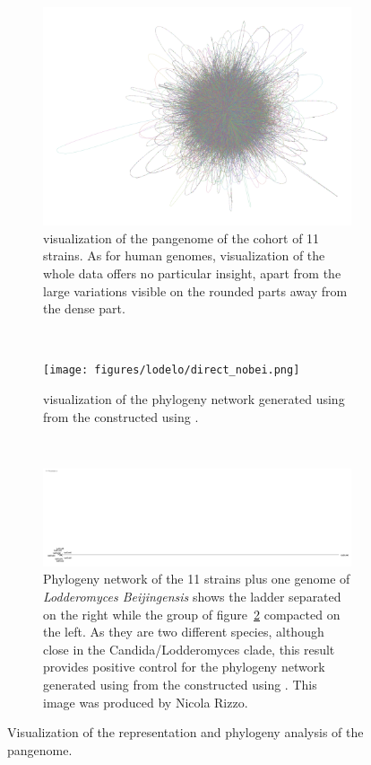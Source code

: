 \begin{figure}[h!]
	\centering
	\begin{subfigure}[b]{0.75\textwidth}
		\centering
		\includegraphics[width=1\linewidth]{figures/lodelo/lodElo_k25.png}
		\caption{\bandage visualization of the pangenome \dbg of the cohort of 11 \lodelo strains. As for human genomes, visualization of the whole data offers no particular insight, apart from the large variations visible on the rounded parts away from the dense part.}
		\label{fig:lodelo_dbg}
	\end{subfigure}%
	\\
	\begin{subfigure}[b]{0.75\textwidth}
		\centering
		\texttt{[image: figures/lodelo/direct\_nobei.png]}
		\caption{\splitstree visualization of the phylogeny network generated using \sans from the \ccdbg constructed using \bifrost.}
		\label{fig:dbg_phyl}
	\end{subfigure}%
	\\
	\begin{subfigure}[b]{0.75\textwidth}
	\centering
	\includegraphics[width=1\linewidth]{figures/lodelo/lodelo_bei.png}
	\caption{Phylogeny network of the 11 \lodelo strains plus one genome of \emph{Lodderomyces Beijingensis} shows the ladder separated on the right while the group of figure~\ref{fig:dbg_phyl} compacted on the left. As they are two different species, although close in the Candida/Lodderomyces clade\cite{lodelo_genomes}, this result provides positive control for the phylogeny network generated using \sans from the \ccdbg constructed using \bifrost. This image was produced by Nicola Rizzo.}
	\label{fig:beig_phyl}
	\end{subfigure}%
	\caption[\ccdbg representation and phylogeny analysis of the \lodelo pangenome.]{Visualization of the \ccdbg representation and phylogeny analysis of the \lodelo pangenome.}
\end{figure}
